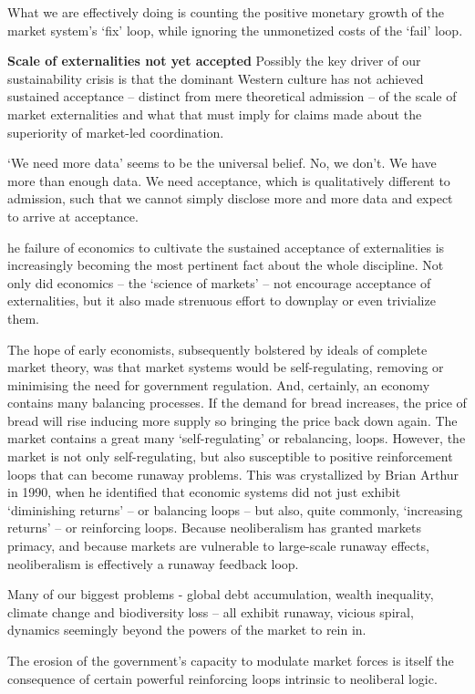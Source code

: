 \documentclass[
]{book}
\begin{document}
What we are effectively doing is counting the positive
monetary growth of the market system's `fix' loop, while ignoring the unmonetized costs of the `fail'
loop.

\textbf{Scale of externalities not yet accepted}
Possibly the key driver of our sustainability crisis is that the dominant Western culture has
not achieved sustained acceptance -- distinct from mere theoretical admission -- of the scale of
market externalities and what that must imply for claims made about the superiority of
market-led coordination.

`We need more data' seems to be the universal belief. No, we don't. We have more than enough data.
We need acceptance, which is qualitatively different to admission, such that we cannot simply
disclose more and more data and expect to arrive at acceptance.

he failure of economics to cultivate the sustained acceptance of externalities is increasingly
becoming the most pertinent fact about the whole discipline. Not only did economics -- the `science
of markets' -- not encourage acceptance of externalities, but it also made strenuous effort to
downplay or even trivialize them.

The hope of early economists, subsequently bolstered by ideals of complete market theory, was that
market systems would be self-regulating, removing or minimising the need for government
regulation. And, certainly, an economy contains many balancing processes. If the demand for bread
increases, the price of bread will rise inducing more supply so bringing the price back down again.
The market contains a great many `self-regulating' or rebalancing, loops.
However, the market is not only self-regulating, but also susceptible to positive reinforcement loops
that can become runaway problems. This was crystallized by Brian Arthur in 1990, when he identified
that economic systems did not just exhibit `diminishing returns' -- or balancing loops -- but also,
quite commonly, `increasing returns' -- or reinforcing loops.
Because neoliberalism has granted markets primacy, and
because markets are vulnerable to large-scale runaway effects, neoliberalism is effectively a runaway
feedback loop.

Many of our biggest problems - global debt accumulation, wealth inequality,
climate change and biodiversity loss -- all exhibit runaway, vicious spiral, dynamics seemingly
beyond the powers of the market to rein in.

The erosion of the government's capacity to modulate market forces is itself the consequence of
certain powerful reinforcing loops intrinsic to neoliberal logic.
\end{document}
